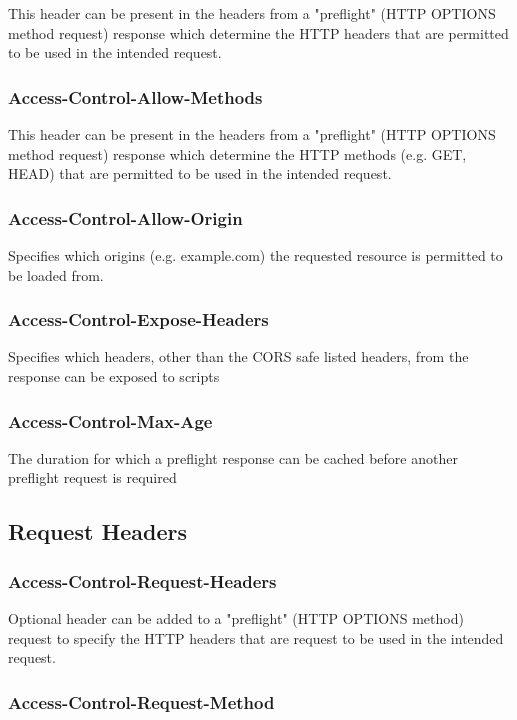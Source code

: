 \documentclass{mscreport}
\begin{document}
This header can be present in the headers from a "preflight" (HTTP OPTIONS method request) response which determine the HTTP headers that are permitted to be used in the intended request.

\subsubsection{Access-Control-Allow-Methods}

This header can be present in the headers from a "preflight" (HTTP OPTIONS method request) response which determine the HTTP methods (e.g. GET, HEAD) that are permitted to be used in the intended request.

\subsubsection{Access-Control-Allow-Origin}

Specifies which origins (e.g. example.com) the requested resource is permitted to be loaded from.

\subsubsection{Access-Control-Expose-Headers}

Specifies which headers, other than the CORS safe listed headers, from the response can be exposed to scripts

\subsubsection{Access-Control-Max-Age}

The duration for which a preflight response can be cached before another preflight request is required

\subsection{Request Headers}
\subsubsection{Access-Control-Request-Headers}

Optional header can be added to a "preflight" (HTTP OPTIONS method) request to specify the HTTP headers that are request to be used in the intended request.

\subsubsection{Access-Control-Request-Method}
\end{document}
